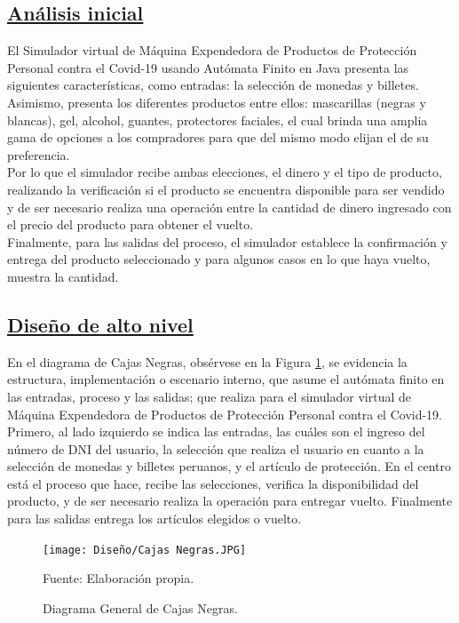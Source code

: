 \documentclass[10pt,conference]{IEEEtran}
\begin{document}
\subsection{\underline{\textbf{Análisis inicial}}}
El Simulador virtual de Máquina Expendedora de Productos de Protección Personal contra el Covid-19 usando Autómata Finito en Java presenta las siguientes características, como entradas: la selección de monedas y billetes. Asimismo, presenta los diferentes productos entre ellos: mascarillas (negras y blancas), gel, alcohol, guantes, protectores faciales, el cual brinda una amplia gama de opciones a los compradores para que del mismo modo elijan el de su preferencia. \\
Por lo que el simulador recibe ambas elecciones, el dinero y el tipo de producto, realizando la verificación si el producto se encuentra disponible para ser vendido y de ser necesario realiza una operación entre la cantidad de dinero ingresado con el precio del producto para obtener el vuelto. \\
Finalmente, para las salidas del proceso, el simulador establece la confirmación y entrega del producto seleccionado y para algunos casos en lo que haya vuelto, muestra la cantidad. 

\subsection{\underline{\textbf{ Diseño de alto nivel}}}
    En el diagrama de Cajas Negras, obsérvese en la Figura \ref{Caja1}, se evidencia la estructura, implementación o escenario interno, que asume el autómata finito en las entradas, proceso y las salidas; que realiza para el simulador virtual de Máquina Expendedora de Productos de Protección Personal contra el Covid-19. Primero, al lado izquierdo se indica las entradas, las cuáles son el ingreso del número de DNI del usuario, la selección que realiza el usuario en cuanto a la selección de monedas y billetes peruanos, y el artículo de protección. En el centro está el proceso que hace, recibe las selecciones, verifica la disponibilidad del producto, y de ser necesario realiza la operación para entregar vuelto. Finalmente para las salidas entrega los artículos elegidos o vuelto.
    
    \begin{figure}[H]
    \begin{center}
    \texttt{[image: Diseño/Cajas Negras.JPG]}
    \caption{Diagrama General de Cajas Negras.}
    \label{Caja1} 
    \vspace{1 mm}
    {\small Fuente: Elaboración propia.}
    \end{center}
    \end{figure}
\end{document}
